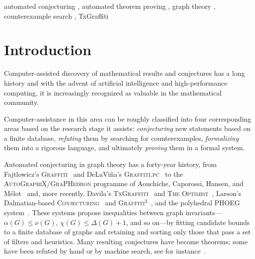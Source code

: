 \documentclass[]{ceurart}
\begin{document}
\begin{keywords}
  automated conjecturing \sep
  automated theorem proving \sep
  graph theory \sep
  counterexample search \sep
  TxGraffiti
\end{keywords}

\maketitle

\section{Introduction}

Computer-assisted discovery of mathematical results and conjectures has a long history and with the advent of artificial intelligence and high-performance computing, it
is increasingly recognized as valuable in the mathematical community.

Computer-assistance in this area can be roughly classified into four corresponding areas based on the research stage it assists: \emph{conjecturing} new statements based on a finite database, \emph{refuting} them by searching for counterexamples, \emph{formalizing} them into a rigorous language, and ultimately \emph{proving} them in a formal system.

Automated conjecturing in graph theory has a forty-year history, from
Fajtlowicz's \textsc{Graffiti}~\cite{fajtlowicz1988conjectures,wiki2026graffiti,larson2002intelligent} and
DeLaVi\~na's \textsc{Graffiti.pc}~\cite{delavina2002graffitipc,delavina2004history}
to the \textsc{AutoGraphiX}/\textsc{GraPHedron} programme of Aouchiche,
Caporossi, Hansen, and M\'elot~\cite{aouchiche2009variable,caporossi2004graphedron,melot2008facet} and,
more recently, Davila's \textsc{TxGraffiti}~\cite{davila2024automated,caro2022txgraffiti}
and \textsc{The Optimist}~\cite{davila2024optimist}, Larson's Dalmatian-based
\textsc{Conjecturing}~\cite{larson2016dalmatian,larson2017automated} and
\textsc{Graffiti}$^3$~\cite{davila2026graffiti3}, and the polyhedral
\textsc{PHOEG} system~\cite{bonte2026phoeg}. These systems propose inequalities
between graph invariants---$\alpha(G)\le\nu(G)$, $\chi(G)\le\Delta(G)+1$, and
so on---by fitting candidate bounds to a finite database of graphs and retaining and sorting only those that pass a set of filters and heuristics. Many resulting conjectures 
have become theorems; some have been refuted by hand or by machine
search, see for instance~\cite{brewster1995computational,larson2017automated,jooken2025computer}.
\end{document}
